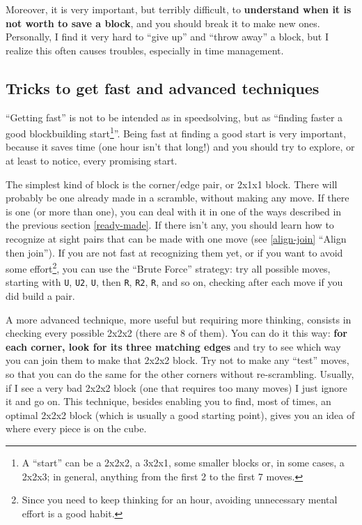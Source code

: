 \documentclass[11pt,a4paper]{book}
\newcommand{\p}{\textquotesingle}
\newcommand{\m}{\texttt}
\begin{document}
Moreover, it is very important, but terribly difficult, to \textbf{understand when it is not worth to save a block}, and you should break it to make new ones. Personally, I find it very hard to ``give up'' and ``throw away'' a block, but I realize this often causes troubles, especially in time management.

\subsection{Tricks to get fast and advanced techniques}

``Getting fast'' is not to be intended as in speedsolving, but as ``finding faster a good blockbuilding start\footnote{A ``start'' can be a 2x2x2, a 3x2x1, some smaller blocks or, in some cases, a 2x2x3; in general, anything from the first 2 to the first 7 moves.}''. Being fast at finding a good start is very important, because it saves time (one hour isn't that long!) and you should try to explore, or at least to notice, every promising start.

The simplest kind of block is the corner/edge pair, or 2x1x1 block. There will probably be one already made in a scramble, without making any move. If there is one (or more than one), you can deal with it in one of the ways described in the previous section \ref{ready-made}. If there isn't any, you should learn how to recognize at sight pairs that can be made with one move (see \ref{align-join} ``Align then join''). If you are not fast at recognizing them yet, or if you want to avoid some effort\footnote{Since you need to keep thinking for an hour, avoiding unnecessary mental effort is a good habit.}, you can use the ``Brute Force'' strategy: try all possible moves, starting with \m U, \m{U2}, \m{U\p}, then \m R, \m{R2}, \m{R\p}, and so on, checking after each move if you did build a pair.

A more advanced technique, more useful but requiring more thinking, consists in checking every possible 2x2x2 (there are 8 of them). You can do it this way: \textbf{for each corner, look for its three matching edges} and try to see which way you can join them to make that 2x2x2 block. Try not to make any ``test'' moves, so that you can do the same for the other corners without re-scrambling. Usually, if I see a very bad 2x2x2 block (one that requires too many moves) I just ignore it and go on. This technique, besides enabling you to find, most of times, an optimal 2x2x2 block (which is usually a good starting point), gives you an idea of where every piece is on the cube.
\end{document}
